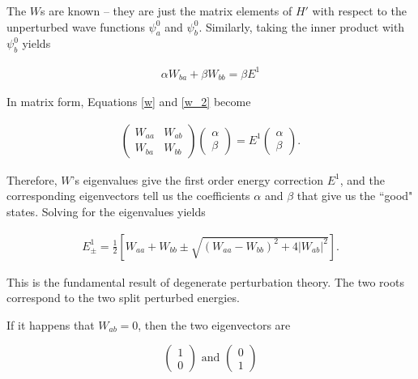 \documentclass[svgnames]{article}     %
\begin{document}
The $W$s are known -- they are just the matrix elements of $H'$ with respect to
the unperturbed wave functions $\psi_a^{0}$ and $\psi_b^{0}$. Similarly, taking the inner product with $\psi_b^{0}$ yields 

\begin{align} \label{w_2}
  \alpha W_{ba} + \beta W_{bb} = \beta E^{1}    
\end{align}\vspace{3px}

In matrix form, Equations \ref{w} and \ref{w_2} become

\begin{align} \label{weq}
  \begin{pmatrix}
    W_{aa} & W_{ab} \\ W_{ba} & W_{bb} 
  \end{pmatrix} \begin{pmatrix}
    \alpha \\ \beta
  \end{pmatrix} = E^{1} \begin{pmatrix}
    \alpha \\ \beta
  \end{pmatrix} . 
\end{align}\vspace{3px}


Therefore, $W$'s eigenvalues give the first order energy correction $E^{1}$,
and the corresponding eigenvectors tell us the coefficients $\alpha$ and
$\beta$ that give us the ``good" states. Solving for the eigenvalues yields 

\vspace{3px}
\begin{tcolorbox}[colback = blue!5!white, colframe = blue!50!black, title
  = First-order energy eigenvalues]

  \begin{align} \label{}
    E_\pm^{1} = \frac{1}{2} \left[ W_{aa} + W_{bb} \pm \sqrt{(W_{aa}
    - W_{bb})^2 + 4|W_{ab}|^2}\right].
  \end{align}\vspace{3px}

\end{tcolorbox}
\vspace{3px}
This is the fundamental result of degenerate perturbation theory. The two roots
correspond to the two split perturbed energies. 

If it happens that $W_{ab} = 0$, then the two eigenvectors are 

 \[
\begin{pmatrix}
  1 \\ 0
\end{pmatrix} \text{ and } \begin{pmatrix}
  0 \\ 1
\end{pmatrix} 
\] \vspace{3px}
\end{document}
